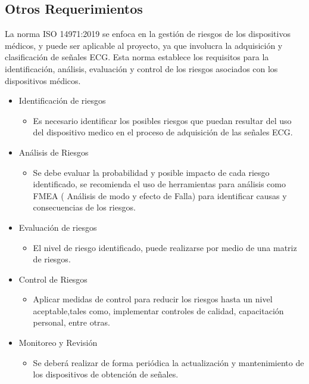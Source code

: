 \subsection{Otros Requerimientos}

La norma ISO 14971:2019 se enfoca en la gestión de riesgos de los dispositivos médicos, y puede  ser aplicable al proyecto, ya que involucra la adquisición y clasificación de señales ECG. Esta norma  establece los requisitos para la identificación, análisis, evaluación y control de los riesgos asociados con los dispositivos médicos.\\


\begin{itemize}
    \item Identificación de riesgos
          \begin{itemize}
              \item Es necesario identificar los posibles riesgos que puedan resultar del uso del
                    dispositivo medico en el proceso de adquisición de las señales ECG.
          \end{itemize}
    \item Análisis de Riesgos
          \begin{itemize}
              \item Se debe evaluar la probabilidad y posible impacto de cada riesgo identificado,
                    se recomienda el uso de herramientas para análisis como FMEA ( Análisis de
                    modo y efecto de Falla) para identificar causas y consecuencias de los riesgos.
          \end{itemize}
    \item Evaluación de riesgos
          \begin{itemize}
              \item El nivel de riesgo identificado, puede realizarse por medio de una matriz de riesgos.
          \end{itemize}
    \item Control de Riesgos
          \begin{itemize}
              \item Aplicar medidas de control para reducir los riesgos hasta un nivel aceptable,tales como, implementar controles de calidad, capacitación personal, entre otras.
          \end{itemize}
    \item Monitoreo y Revisión
          \begin{itemize}
              \item  Se deberá realizar de forma periódica la actualización y mantenimiento de los dispositivos de obtención de señales.
          \end{itemize}
\end{itemize}

